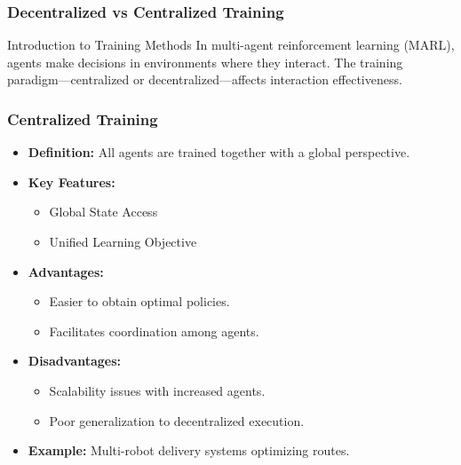 \documentclass[aspectratio=169]{beamer}
\begin{document}
\begin{frame}
    \frametitle{Decentralized vs Centralized Training}
    \begin{block}{Introduction to Training Methods}
        In multi-agent reinforcement learning (MARL), agents make decisions in environments where they interact. The training paradigm—centralized or decentralized—affects interaction effectiveness.
    \end{block}
\end{frame}

\begin{frame}
    \frametitle{Centralized Training}
    \begin{itemize}
        \item \textbf{Definition:} All agents are trained together with a global perspective.
        \item \textbf{Key Features:}
            \begin{itemize}
                \item Global State Access
                \item Unified Learning Objective
            \end{itemize}
        \item \textbf{Advantages:}
            \begin{itemize}
                \item Easier to obtain optimal policies.
                \item Facilitates coordination among agents.
            \end{itemize}
        \item \textbf{Disadvantages:}
            \begin{itemize}
                \item Scalability issues with increased agents.
                \item Poor generalization to decentralized execution.
            \end{itemize}
        \item \textbf{Example:} Multi-robot delivery systems optimizing routes.
    \end{itemize}
\end{frame}
\end{document}
